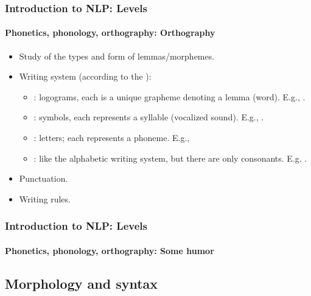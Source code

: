 \documentclass[xcolor=table]{beamer}
\begin{document}
\begin{frame}
\frametitle{Introduction to NLP: Levels}
\framesubtitle{Phonetics, phonology, orthography: Orthography}

\begin{itemize}
	\item Study of the types and form of lemmas/morphemes.
	\item Writing system (according to the ): 
	\begin{itemize}
		\item {}: logograms, each is a unique grapheme denoting a lemma (word).
		E.g., .
		\item {}: symbols, each represents a syllable (vocalized sound).
		E.g., .
		\item {}: letters; each represents a phoneme.
		E.g., 
		\item {}: like the alphabetic writing system, but there are only consonants. 
		E.g. .
	\end{itemize}
	\item Punctuation.
	\item Writing rules.
\end{itemize}

\end{frame}

\begin{frame}
\frametitle{Introduction to NLP: Levels}
\framesubtitle{Phonetics, phonology, orthography: Some humor}

\begin{center}
\end{center}

\end{frame}

\subsection{Morphology and syntax}
\end{document}
